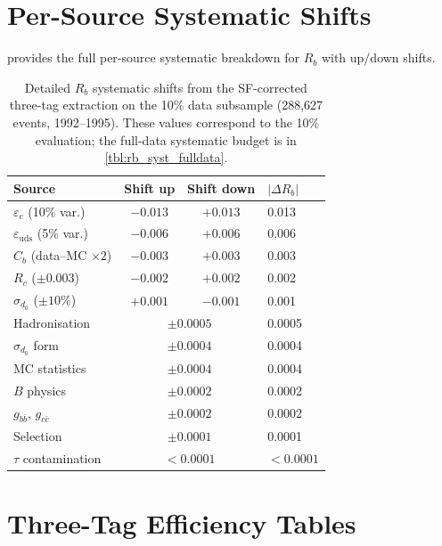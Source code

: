 \documentclass[11pt,a4paper]{article}
\begin{document}
\section{Per-Source Systematic Shifts}
\label{app:syst-tables}

 provides the full per-source
systematic breakdown for $R_b$ with up/down shifts.

\begin{table}[htbp]
\centering
\caption{Detailed $R_b$ systematic shifts from the SF-corrected
three-tag extraction on the 10\% data subsample (288,627 events,
1992--1995).  These values correspond to the 10\% evaluation;
the full-data systematic budget is in \cref{tbl:rb_syst_fulldata}.}
\label{tbl:syst_shifts_rb_detail}
\begin{tabular}{lccl}
\toprule
Source & Shift up & Shift down & $|\Delta R_b|$ \\
\midrule
$\varepsilon_c$ (10\% var.) & $-0.013$ & $+0.013$ & 0.013 \\
$\varepsilon_\text{uds}$ (5\% var.) & $-0.006$ & $+0.006$ & 0.006 \\
$C_b$ (data--MC $\times 2$) & $-0.003$ & $+0.003$ & 0.003 \\
$R_c$ ($\pm 0.003$) & $-0.002$ & $+0.002$ & 0.002 \\
$\sigma_{d_0}$ ($\pm 10\%$) & $+0.001$ & $-0.001$ & 0.001 \\
Hadronisation & \multicolumn{2}{c}{$\pm 0.0005$} & 0.0005 \\
$\sigma_{d_0}$ form & \multicolumn{2}{c}{$\pm 0.0004$} & 0.0004 \\
MC statistics & \multicolumn{2}{c}{$\pm 0.0004$} & 0.0004 \\
$B$ physics & \multicolumn{2}{c}{$\pm 0.0002$} & 0.0002 \\
$g_{b\bar{b}}$, $g_{c\bar{c}}$ & \multicolumn{2}{c}{$\pm 0.0002$} & 0.0002 \\
Selection & \multicolumn{2}{c}{$\pm 0.0001$} & 0.0001 \\
$\tau$ contamination & \multicolumn{2}{c}{$< 0.0001$} & $<0.0001$ \\
\bottomrule
\end{tabular}
\end{table}

\section{Three-Tag Efficiency Tables}
\label{app:efficiency}
\end{document}
